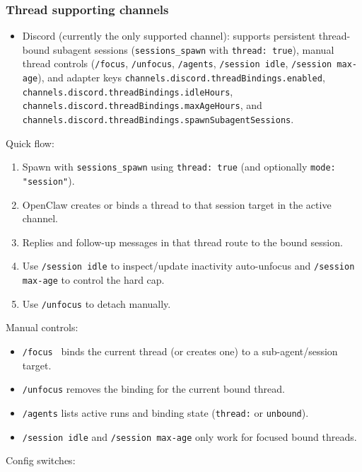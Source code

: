 \subsubsection{Thread supporting channels}


\begin{itemize}
  \item Discord (currently the only supported channel): supports persistent thread-bound subagent sessions (\texttt{sessions\_spawn} with \texttt{thread: true}), manual thread controls (\texttt{/focus}, \texttt{/unfocus}, \texttt{/agents}, \texttt{/session idle}, \texttt{/session max-age}), and adapter keys \texttt{channels.discord.threadBindings.enabled}, \texttt{channels.discord.threadBindings.idleHours}, \texttt{channels.discord.threadBindings.maxAgeHours}, and \texttt{channels.discord.threadBindings.spawnSubagentSessions}.
\end{itemize}


Quick flow:

\begin{enumerate}
  \item Spawn with \texttt{sessions\_spawn} using \texttt{thread: true} (and optionally \texttt{mode: "session"}).
  \item OpenClaw creates or binds a thread to that session target in the active channel.
  \item Replies and follow-up messages in that thread route to the bound session.
  \item Use \texttt{/session idle} to inspect/update inactivity auto-unfocus and \texttt{/session max-age} to control the hard cap.
  \item Use \texttt{/unfocus} to detach manually.
\end{enumerate}


Manual controls:

\begin{itemize}
  \item \texttt{/focus } binds the current thread (or creates one) to a sub-agent/session target.
  \item \texttt{/unfocus} removes the binding for the current bound thread.
  \item \texttt{/agents} lists active runs and binding state (\texttt{thread:} or \texttt{unbound}).
  \item \texttt{/session idle} and \texttt{/session max-age} only work for focused bound threads.
\end{itemize}


Config switches:

